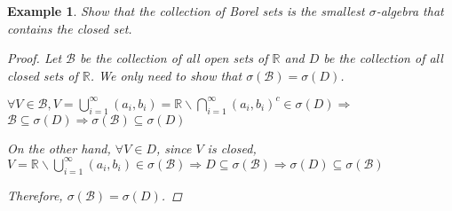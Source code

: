 \documentclass{article}
\newtheorem{example}{Example}
\def\B{\mathcal{B}}
\def\R{\mathbb{R}}
\begin{document}
\begin{example}
Show that the collection of Borel sets is the smallest $\sigma$-algebra that contains the closed set.
\begin{proof}
Let $\B$ be the collection of all open sets of $\R$ and $D$ be the collection of all closed sets of $\R$. We only need to show
that $\sigma(\B)=\sigma(D)$.

$\forall V \in \B, V=\bigcup_{i=1}^{\infty} (a_i,b_i) = \R\backslash \bigcap_{i=1}^{\infty} (a_i,b_i)^c \in \sigma(D) \Rightarrow$
$\B \subseteq \sigma(D) \Rightarrow \sigma(\B) \subseteq \sigma(D)$

On the other hand, $\forall V \in D$, since $V$ is closed, $V = \R\backslash \bigcup_{i=1}^{\infty} (a_i,b_i) 
\in \sigma(\B) \Rightarrow D \subseteq \sigma(\B) \Rightarrow \sigma(D)\subseteq \sigma(\B)$

Therefore, $\sigma(\B) = \sigma(D)$.
\end{proof}
\end{example}
\end{document}
